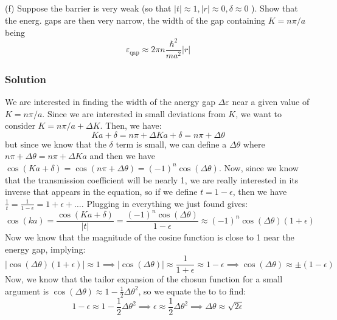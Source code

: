 \documentclass[12pt]{article}
\begin{document}
\subsection{}
(f) Suppose the barrier is very weak (so that $|t| \approx 1,|r| \approx 0, \delta \approx 0$ ). Show that the energ. gaps are then very narrow, the width of the gap containing $K=n \pi / a$ being
$$
\varepsilon_{\mathrm{qap}} \approx 2 \pi n \frac{\hbar^2}{m a^2}|r|
$$
\subsubsection{Solution}
We are interested in finding the width of the anergy gap $\Delta \varepsilon$ near a given value of $K = n\pi/a$. Since we are interested in small deviations from $K$, we want to consider $K = n\pi/a + \Delta K$. Then, we have:
\begin{equation}
    Ka + \delta = n\pi + \Delta K a + \delta = n\pi + \Delta \theta
\end{equation}
but since we know that the $\delta$ term is small, we can define a $\Delta \theta$ where $n\pi +\Delta \theta = n\pi + \Delta K a $ and then we have $\cos(Ka + \delta) = \cos(n\pi + \Delta \theta) = (-1)^n\cos(\Delta \theta)$. Now, since we know that the transmission coefficient will be nearly 1, we are really interested in its inverse that appears in the equation, so if we define $t = 1 - \epsilon$, then we have $\frac{1}{t} = \frac{1}{1 - \epsilon} = 1 + \epsilon + \ldots$. Plugging in everything we just found gives:
\begin{equation}
    \cos(ka) = \frac{\cos(Ka + \delta)}{|t|} = \frac{(-1)^n\cos(\Delta \theta)}{1 - \epsilon} \approx (-1)^n\cos(\Delta \theta)(1 + \epsilon)
\end{equation}
Now we know that the magnitude of the cosine function is close to 1 near the energy gap, implying:
\begin{equation}
    |\cos(\Delta \theta)(1 + \epsilon)| \approx 1 \implies |\cos(\Delta \theta)| \approx \frac{1}{1 + \epsilon} \approx 1 - \epsilon \implies \cos(\Delta \theta) \approx \pm(1 - \epsilon)
\end{equation}
Now, we know that the tailor expansion of the chosun function for a small argument is $\cos(\Delta \theta) \approx 1 - \frac{1}{2}\Delta \theta^2$, so we equate the to to find:
\begin{equation}
    1 - \epsilon \approx 1 - \frac{1}{2}\Delta \theta^2 \implies \epsilon \approx \frac{1}{2}\Delta \theta^2 \implies \Delta \theta \approx \sqrt{2\epsilon}
\end{equation}
\end{document}
